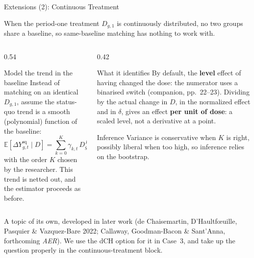 \documentclass[main.tex]{subfiles}
\begin{document}
\begin{frame}{Extensions (2): Continuous Treatment}

  When the period-one treatment $D_{g,1}$ is continuously distributed, no two
  groups share a baseline, so same-baseline matching has nothing to work with.

  \medskip
  \begin{columns}[T]
    \begin{column}{0.54\textwidth}
      \begin{block}{Model the trend in the baseline}
        \footnotesize
        Instead of matching on an identical $D_{g,1}$, assume the status-quo
        trend is a smooth (polynomial) function of the baseline:
        \[
          \mathbb{E}\!\left[\Delta Y_{g,t}^{\text{sq}}\mid D\right]
            = \sum_{k=0}^{K}\gamma_{k,t}\,D_{g,1}^{\,k},
        \]
        with the order $K$ chosen by the researcher. This trend is netted out,
        and the estimator proceeds as before.
      \end{block}
    \end{column}
    \begin{column}{0.42\textwidth}
      \begin{block}{\footnotesize What it identifies}
        \footnotesize
        By default, the \textbf{level} effect of having changed the dose: the
        numerator uses a binarised switch (companion, pp.~22--23). Dividing by
        the actual change in $D$, in the normalized effect and in $\delta$,
        gives an effect \textbf{per unit of dose}: a scaled level, not a
        derivative at a point.
      \end{block}

      \smallskip
      \begin{alertblock}{\footnotesize Inference}
        \footnotesize
        Variance is conservative when $K$ is right, possibly liberal when too
        high, so inference relies on the bootstrap.
      \end{alertblock}
    \end{column}
  \end{columns}

  \smallskip
  \footnotesize A topic of its own, developed in later work (de Chaisemartin,
  D'Haultf\oe{}uille, Pasquier \& Vazquez-Bare 2022; Callaway, Goodman-Bacon \&
  Sant'Anna, forthcoming \textit{AER}). We use the dCH option for it in Case~3,
  and take up the question properly in the continuous-treatment block.

\end{frame}
\end{document}
